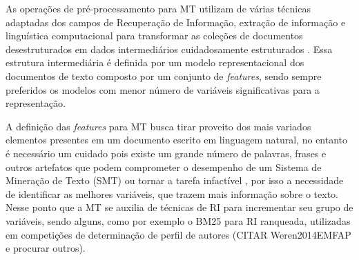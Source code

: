 

As operações de pré-processamento para MT utilizam de várias técnicas adaptadas dos campos de Recuperação de Informação, extração de informação e linguística computacional para transformar as coleções de documentos desestruturados em dados intermediários cuidadosamente estruturados \cite[p.2-3]{Feldman:2006:TMH:1076381}. 
Essa estrutura intermediária é definida por um modelo representacional dos documentos de texto composto por um conjunto de \textit{features}, sendo sempre preferidos os modelos com menor número de variáveis significativas para a representação.


A definição das \textit{features} para MT busca tirar proveito dos mais variados elementos presentes em um documento escrito em linguagem natural, no entanto é necessário um cuidado pois existe um grande número de palavras, frases e outros artefatos que podem comprometer o desempenho de um Sistema de Mineração de Texto (SMT) ou tornar a tarefa infactível %
, por isso a necessidade de identificar as melhores variáveis, que trazem mais informação sobre o texto. 
Nesse ponto que a MT se auxilia de técnicas de RI para incrementar seu grupo de variáveis, sendo alguns, como por exemplo o BM25 para RI ranqueada, utilizadas em competições de determinação de perfil de autores (CITAR Weren2014EMFAP e procurar outros).

